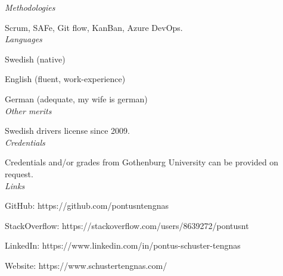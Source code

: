 {\itshape Methodologies}

Scrum, SAFe, Git flow, KanBan, Azure DevOps.\\

{\itshape Languages}

Swedish (native)

English (fluent, work-experience)

German (adequate, my wife is german)\\

{\itshape Other merits}

Swedish drivers license since 2009.\\

{\itshape Credentials}

Credentials and/or grades from Gothenburg University can be provided on request.\\

{\itshape Links}

GitHub: https://github.com/pontusntengnas

StackOverflow: https://stackoverflow.com/users/8639272/pontusnt

LinkedIn: https://www.linkedin.com/in/pontus-schuster-tengnas

Website: https://www.schustertengnas.com/
